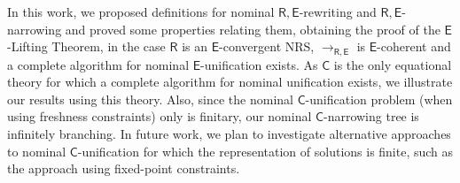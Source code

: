 \documentclass[11pt,a4paper]{amsart}
\newcommand{\theory}[1]{\ensuremath{\mathsf{#1}}}
\theoremstyle{plain}
\theoremstyle{definition}
\theoremstyle{remark}
\begin{document}
In this work, we proposed definitions for nominal $\theory{R,E}$-rewriting and $\theory{R,E}$-narrowing and proved some properties relating them, obtaining the proof of the \theory{E}-Lifting Theorem, in the case \theory{R}  is an \theory{E}-convergent NRS, $\to_\theory{R,E}$ is \theory{E}-coherent and a complete algorithm for nominal \theory{E}-unification exists. %
As $\theory{C}$ is the only equational theory for which a complete algorithm for nominal unification exists, we illustrate our results using this theory. Also, since the nominal \theory{C}-unification problem (when using freshness constraints)  only is finitary, our nominal $\theory{C}$-narrowing tree is infinitely branching. In future work, we plan to investigate alternative approaches to nominal \theory{C}-unification for which the representation of solutions is finite, such as the approach using fixed-point constraints.






\end{document}
